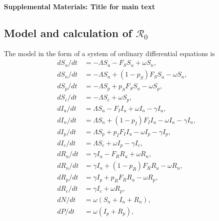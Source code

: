 \documentclass[12pt]{article}
\newcommand{\Rnum}{\mathcal{R}_0}
\theoremstyle{definition} %
\begin{document}


\clearpage
\begin{center}
\textbf{\large Supplemental Materials: Title for main text}
\end{center}
\setcounter{equation}{0}
\setcounter{figure}{0}
\setcounter{table}{0}
\setcounter{page}{1}
\makeatletter
\renewcommand{\theequation}{S\arabic{equation}}
\renewcommand{\thefigure}{S\arabic{figure}}
\renewcommand{\bibnumfmt}[1]{[S#1]}
\renewcommand{\citenumfont}[1]{S#1}

\subsection{Model and calculation of $\Rnum$}

The model in the form of a system of ordinary differential equations is 
\begin{subequations}\label{model}
\begin{align}
 d S_u/dt &= -\Lambda S_u - F_S S_u + \omega S_n, \\
 d S_n/dt &= -\Lambda S_n + (1-p_S) F_S S_u - \omega S_n, \\
 d S_p/dt &= -\Lambda S_p + p_S F_S S_u - \omega S_p, \\
 d S_c/dt &= -\Lambda S_c + \omega S_p, \\
 d I_u/dt &= \Lambda S_u - F_I I_u + \omega I_n  - \gamma I_u, \\
 d I_n/dt &= \Lambda S_n + (1-p_I) F_I I_u - \omega I_n -\gamma I_n, \\
 d I_p/dt &= \Lambda S_p + p_I F_I I_u - \omega I_p -\gamma I_p, \\
 d I_c/dt &= \Lambda S_c + \omega I_p - \gamma I_c, \\
 d R_u/dt &= \gamma I_u - F_R R_u + \omega R_n, \\
 d R_n/dt &= \gamma I_n + (1-p_R) F_R R_u - \omega R_n, \\
 d R_p/dt &= \gamma I_p + p_R F_R R_u  - \omega R_p, \\
 d R_c/dt&= \gamma I_c + \omega R_p, \\
 dN/dt &= \omega (S_n + I_n + R_n),  \\
 dP/dt &= \omega(I_p + R_p) ,
\end{align}
\end{subequations}
\end{document}
